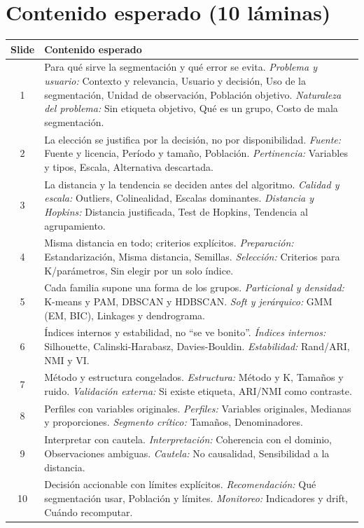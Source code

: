 \documentclass[11pt,letterpaper]{article}
\begin{document}
\section*{Contenido esperado (10 láminas)}
\begin{center}\small
\begin{tabular}{c p{13.2cm}}
\toprule
Slide & Contenido esperado \\
\midrule
1 & Para qué sirve la segmentación y qué error se evita. \emph{Problema y usuario:} Contexto y relevancia, Usuario y decisión, Uso de la segmentación, Unidad de observación, Población objetivo. \emph{Naturaleza del problema:} Sin etiqueta objetivo, Qué es un grupo, Costo de mala segmentación. \\
2 & La elección se justifica por la decisión, no por disponibilidad. \emph{Fuente:} Fuente y licencia, Período y tamaño, Población. \emph{Pertinencia:} Variables y tipos, Escala, Alternativa descartada. \\
3 & La distancia y la tendencia se deciden antes del algoritmo. \emph{Calidad y escala:} Outliers, Colinealidad, Escalas dominantes. \emph{Distancia y Hopkins:} Distancia justificada, Test de Hopkins, Tendencia al agrupamiento. \\
4 & Misma distancia en todo; criterios explícitos. \emph{Preparación:} Estandarización, Misma distancia, Semillas. \emph{Selección:} Criterios para K/parámetros, Sin elegir por un solo índice. \\
5 & Cada familia supone una forma de los grupos. \emph{Particional y densidad:} K-means y PAM, DBSCAN y HDBSCAN. \emph{Soft y jerárquico:} GMM (EM, BIC), Linkages y dendrograma. \\
6 & Índices internos y estabilidad, no ``se ve bonito''. \emph{Índices internos:} Silhouette, Calinski-Harabasz, Davies-Bouldin. \emph{Estabilidad:} Rand/ARI, NMI y VI. \\
7 & Método y estructura congelados. \emph{Estructura:} Método y K, Tamaños y ruido. \emph{Validación externa:} Si existe etiqueta, ARI/NMI como contraste. \\
8 & Perfiles con variables originales. \emph{Perfiles:} Variables originales, Medianas y proporciones. \emph{Segmento crítico:} Tamaños, Denominadores. \\
9 & Interpretar con cautela. \emph{Interpretación:} Coherencia con el dominio, Observaciones ambiguas. \emph{Cautela:} No causalidad, Sensibilidad a la distancia. \\
10 & Decisión accionable con límites explícitos. \emph{Recomendación:} Qué segmentación usar, Población y límites. \emph{Monitoreo:} Indicadores y drift, Cuándo recomputar. \\
\bottomrule
\end{tabular}\end{center}
\end{document}
